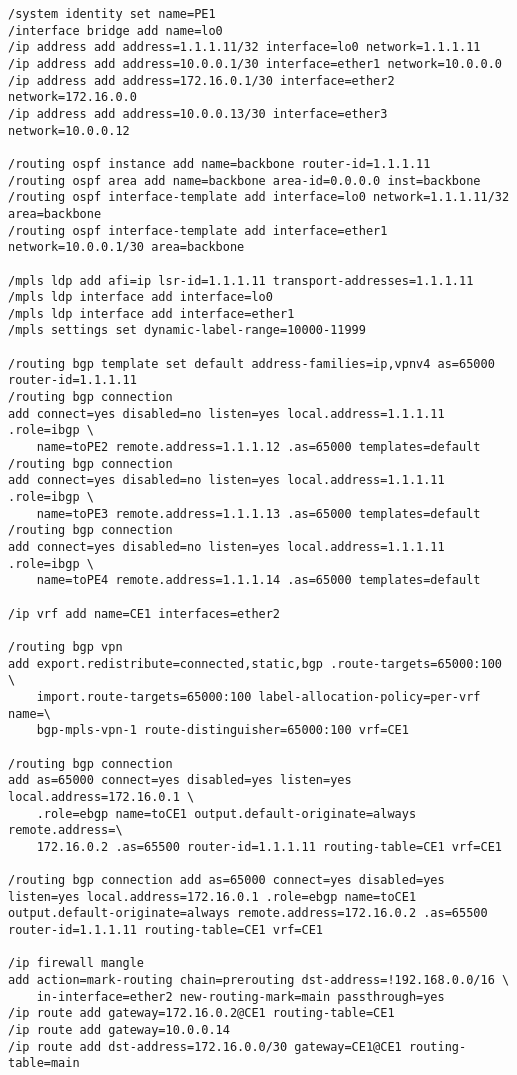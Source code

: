 \begin{lstlisting}[language=RouterOS]
/system identity set name=PE1
/interface bridge add name=lo0
/ip address add address=1.1.1.11/32 interface=lo0 network=1.1.1.11
/ip address add address=10.0.0.1/30 interface=ether1 network=10.0.0.0
/ip address add address=172.16.0.1/30 interface=ether2 network=172.16.0.0
/ip address add address=10.0.0.13/30 interface=ether3 network=10.0.0.12

/routing ospf instance add name=backbone router-id=1.1.1.11
/routing ospf area add name=backbone area-id=0.0.0.0 inst=backbone
/routing ospf interface-template add interface=lo0 network=1.1.1.11/32 area=backbone
/routing ospf interface-template add interface=ether1 network=10.0.0.1/30 area=backbone

/mpls ldp add afi=ip lsr-id=1.1.1.11 transport-addresses=1.1.1.11
/mpls ldp interface add interface=lo0
/mpls ldp interface add interface=ether1
/mpls settings set dynamic-label-range=10000-11999

/routing bgp template set default address-families=ip,vpnv4 as=65000 router-id=1.1.1.11
/routing bgp connection
add connect=yes disabled=no listen=yes local.address=1.1.1.11 .role=ibgp \
    name=toPE2 remote.address=1.1.1.12 .as=65000 templates=default
/routing bgp connection
add connect=yes disabled=no listen=yes local.address=1.1.1.11 .role=ibgp \
    name=toPE3 remote.address=1.1.1.13 .as=65000 templates=default
/routing bgp connection
add connect=yes disabled=no listen=yes local.address=1.1.1.11 .role=ibgp \
    name=toPE4 remote.address=1.1.1.14 .as=65000 templates=default

/ip vrf add name=CE1 interfaces=ether2 

/routing bgp vpn
add export.redistribute=connected,static,bgp .route-targets=65000:100 \
    import.route-targets=65000:100 label-allocation-policy=per-vrf name=\
    bgp-mpls-vpn-1 route-distinguisher=65000:100 vrf=CE1

/routing bgp connection
add as=65000 connect=yes disabled=yes listen=yes local.address=172.16.0.1 \
    .role=ebgp name=toCE1 output.default-originate=always remote.address=\
    172.16.0.2 .as=65500 router-id=1.1.1.11 routing-table=CE1 vrf=CE1

/routing bgp connection add as=65000 connect=yes disabled=yes listen=yes local.address=172.16.0.1 .role=ebgp name=toCE1 output.default-originate=always remote.address=172.16.0.2 .as=65500 router-id=1.1.1.11 routing-table=CE1 vrf=CE1

/ip firewall mangle
add action=mark-routing chain=prerouting dst-address=!192.168.0.0/16 \
    in-interface=ether2 new-routing-mark=main passthrough=yes
/ip route add gateway=172.16.0.2@CE1 routing-table=CE1
/ip route add gateway=10.0.0.14
/ip route add dst-address=172.16.0.0/30 gateway=CE1@CE1 routing-table=main
\end{lstlisting}

